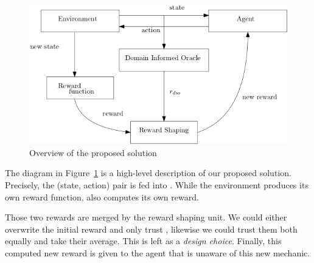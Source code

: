 \begin{figure}[H]
  \centering
  \includegraphics[scale=0.45]{figures/overview.png}
  \caption{Overview of the proposed solution}
  \label{fig:overview}
\end{figure}


The diagram in Figure~\ref{fig:overview} is a high-level description of our proposed solution. 
%
Precisely, the (state, action) pair is fed into \dio{}. While the environment produces its own 
reward function, \dio{} also computes its own reward. 

Those two rewards are merged by the reward shaping unit. We could either 
overwrite the initial reward and only trust \dio{}, likewise we could trust them both equally and take their average. This is left as a \emph{design choice}. 
Finally, this computed new reward is given to the agent that is unaware of this new mechanic. 
